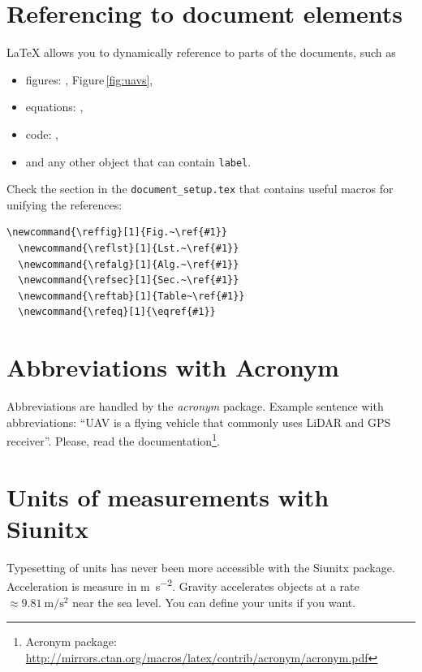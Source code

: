 \section{Referencing to document elements}

LaTeX allows you to dynamically reference to parts of the documents, such as
\begin{itemize}
  \item figures: , Figure\,\ref{fig:uavs},
  \item equations: ,
  \item code: ,
  \item and any other object that can contain \texttt{label}.
\end{itemize}

Check the section in the \texttt{document\_setup.tex} that contains useful macros for unifying the references:

\begin{lstlisting}[caption={LaTeX macros for referencing to document elements.},label={lst:references}]
  \newcommand{\reffig}[1]{Fig.~\ref{#1}}
  \newcommand{\reflst}[1]{Lst.~\ref{#1}}
  \newcommand{\refalg}[1]{Alg.~\ref{#1}}
  \newcommand{\refsec}[1]{Sec.~\ref{#1}}
  \newcommand{\reftab}[1]{Table~\ref{#1}}
  \newcommand{\refeq}[1]{\eqref{#1}}
\end{lstlisting}

\section{Abbreviations with Acronym}

Abbreviations are handled by the \emph{acronym} package.
Example sentence with abbreviations: ``\ac{UAV} is a flying vehicle that commonly uses \ac{LiDAR} and \ac{GPS} receiver''.
Please, read the documentation\footnote{Acronym package: \url{http://mirrors.ctan.org/macros/latex/contrib/acronym/acronym.pdf}}.

\section{Units of measurements with Siunitx}

Typesetting of units has never been more accessible with the Siunitx package.
Acceleration is measure in \si{\meter\per\second\squared}.
Gravity accelerates objects at a rate $\approx \SI{9.81}{\meter\per\second\squared}$ near the sea level.
You can define your units if you want.

